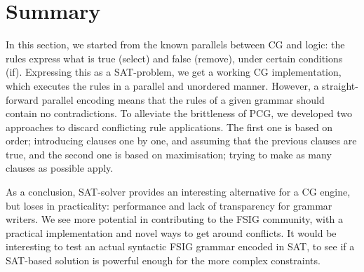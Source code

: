 \section{Summary}

In this section, we started from the known parallels between CG and logic:
the rules express what is true ({\sc select}) and false ({\sc remove}), under certain conditions ({\sc if}).
Expressing this as a SAT-problem, we get a working CG implementation, which executes the rules in a parallel and unordered manner. 
However, a straight-forward parallel encoding means that the rules of a given grammar should contain no contradictions.  
To alleviate the brittleness of PCG, we developed two approaches to discard conflicting rule applications.
The first one is based on order; introducing clauses one by one, and assuming that the previous clauses are true, 
and the second one is based on maximisation; trying to make as many clauses as possible apply.


As a conclusion, SAT-solver provides an interesting alternative for a CG engine, but loses in practicality: performance and lack of transparency for grammar writers.
We see more potential in contributing to the FSIG community, with a practical implementation and 
novel ways to get around conflicts. It would be interesting to test an actual syntactic FSIG grammar encoded in SAT, to see if a SAT-based solution is powerful enough for the more complex constraints.







